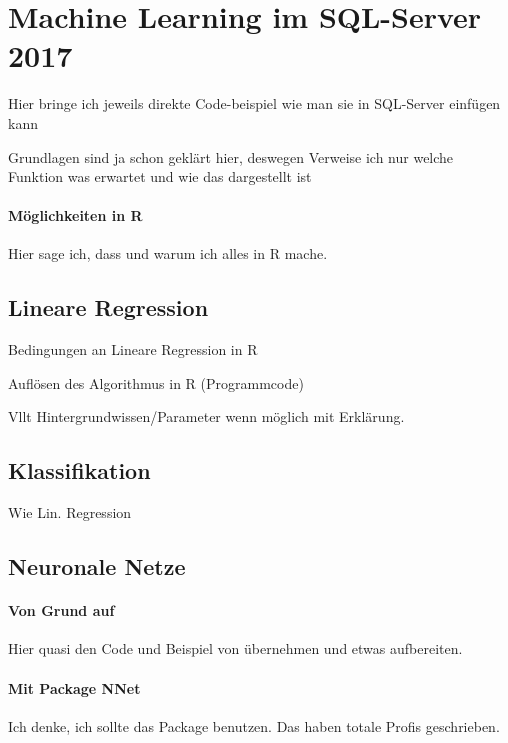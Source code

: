 \section{Machine Learning im SQL-Server 2017}
\label{sec:MLSQL} \label{sec:MachineLearning}
Hier bringe ich jeweils direkte Code-beispiel wie man sie in SQL-Server einfügen kann

Grundlagen sind ja schon geklärt hier, deswegen Verweise ich nur welche Funktion was erwartet und wie das dargestellt ist

\paragraph{Möglichkeiten in  R}
Hier sage ich, dass und warum ich alles in R mache.
\subsection{Lineare Regression}
Bedingungen an Lineare Regression in R

Auflösen des Algorithmus in R (Programmcode)

Vllt Hintergrundwissen/Parameter wenn möglich mit Erklärung. 
\subsection{Klassifikation}
Wie Lin. Regression
\subsection{Neuronale Netze}
\paragraph{Von Grund auf}
Hier quasi den Code und Beispiel von \cite{SelbyNN} übernehmen und etwas aufbereiten.

\paragraph{Mit Package NNet}
Ich denke, ich sollte das Package benutzen. Das haben totale Profis geschrieben. 